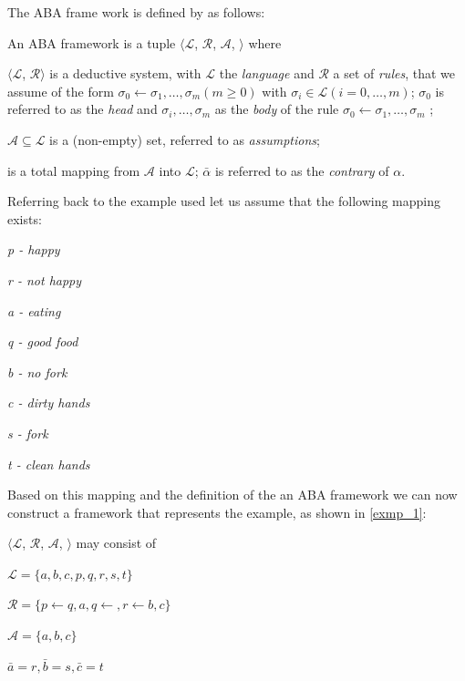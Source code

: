 The ABA frame work is defined by \cite{abatut} as follows:

\begin{defn}
An ABA framework is a tuple $\langle\mathcal{L}$, $\mathcal{R}$, $\mathcal{A}$, {\bf\textasciimacron} $\rangle$ where
\begin{itemize*}
	\item $\langle\mathcal{L}$, $\mathcal{R}\rangle$ is a deductive system, with $\mathcal{L}$ the \emph{language} and $\mathcal{R}$ a set of \emph{rules}, that we assume of the form $\sigma_0 \leftarrow \sigma_1, \ldots, \sigma_m (m \geq 0)$ with $\sigma_i \in \mathcal{L} (i = 0, \ldots, m)$; $\sigma_0$ is referred to as the \emph{head} and $\sigma_i, \ldots, \sigma_m $  as the \emph{body} of the rule $\sigma_0 \leftarrow \sigma_1, \ldots, \sigma_m $ ;
	\item $\mathcal{A}\subseteq\mathcal{L}$ is a (non-empty) set, referred to as \emph{assumptions};
	\item {\bf\textasciimacron} is a total mapping from $\mathcal{A}$ into $\mathcal{L}$; $\bar{\alpha}$ is referred to as the \emph{contrary} of $\alpha$.
	
\end{itemize*}
\end{defn}

Referring back to the example used let us assume that the following mapping exists:

\begin{multicols}{2}
\begin{itemize*}

\item \it{p} - happy
\item \it{r} - not happy
\item \it{a} - eating
\item \it{q} - good food
\item \it{b} - no fork
\item \it{c} - dirty hands
\item \it{s} - fork
\item \it{t} - clean hands

\end{itemize*}
\end{multicols}

Based on this mapping and the definition of the an ABA framework we can now construct a framework that represents the example, as shown in \cref{exmp_1}:

\begin{exmp}\label{exmp_1}
$\langle\mathcal{L}$, $\mathcal{R}$, $\mathcal{A}$, {\bf\textasciimacron} $\rangle$ may consist of

$\mathcal{L} = \{a,b,c,p,q,r,s,t\}$

$\mathcal{R} = \{p \leftarrow q,a, q \leftarrow, r \leftarrow b,c \}$

$\mathcal{A} = \{a, b, c\}$

$\bar{a} = r, \bar{b} = s, \bar{c} = t $

\end{exmp}


